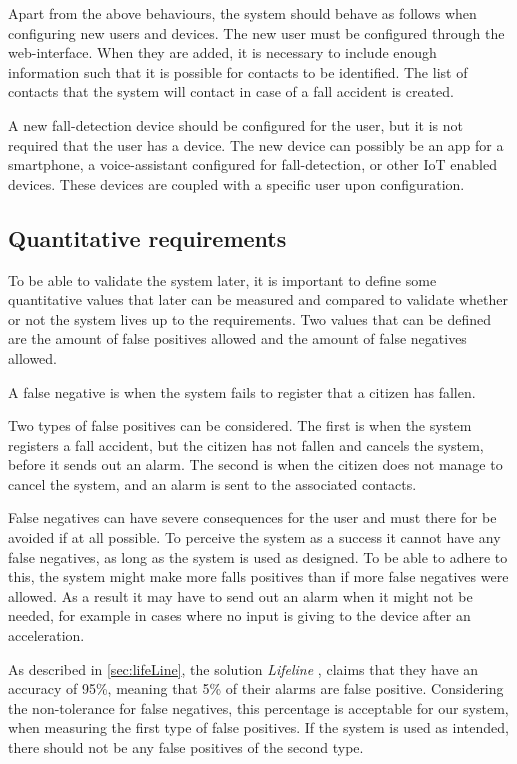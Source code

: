 Apart from the above behaviours, the system should behave as follows when configuring new users and devices. The new user must be configured through the web-interface. When they are added, it is necessary to include enough information such that it is possible for contacts to be identified. The list of contacts that the system will contact in case of a fall accident is created.

A new fall-detection device should be configured for the user, but it is not required that the user has a device.
The new device can possibly be an app for a smartphone, a voice-assistant configured for fall-detection, or other IoT enabled devices. These devices are coupled with a specific user upon configuration.

\subsection{Quantitative requirements}
\label{sec:q-requirements}
To be able to validate the system later, it is important to define some quantitative values that later can be measured and compared to validate whether or not the system lives up to the requirements. Two values that can be defined are the amount of false positives allowed and the amount of false negatives allowed.

A false negative is when the system fails to register that a citizen has fallen.
 
Two types of false positives can be considered. The first is when the system registers a fall accident, but the citizen has not fallen and cancels the system, before it sends out an alarm. The second is when the citizen does not manage to cancel the system, and an alarm is sent to the associated contacts.

False negatives can have severe consequences for the user and must there for be avoided if at all possible. To perceive the system as a success it cannot have any false negatives, as long as the system is used as designed. To be able to adhere to this, the system might make more falls positives than if more false negatives were allowed. As a result it may have to send out an alarm when it might not be needed, for example in cases where no input is giving to the device after an acceleration.

As described in \ref{sec:lifeLine}, the solution \textit{Lifeline} \cite{AAlert}, claims that they have an accuracy of 95\%, meaning that 5\% of their alarms are false positive. Considering the non-tolerance for false negatives, this percentage is acceptable for our system, when measuring the first  type of false positives. If the system is used as intended, there should not be any false positives of the second type.


